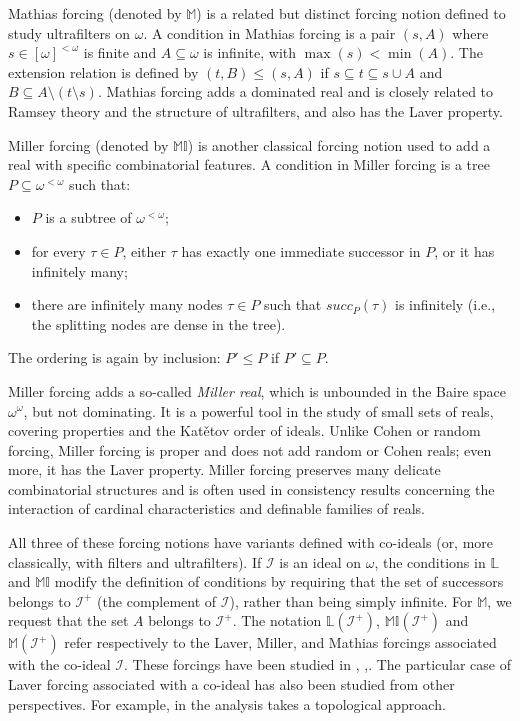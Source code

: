 \documentclass{amsart}
\theoremstyle{definition}
\theoremstyle{remark}
\numberwithin{equation}{section}
\newcommand{\li}{\mathbb{L}(\mathcal{I}^+)}
\newcommand{\lav}{\mathbb{L}}
\newcommand{\mil}{\mathbb{MI}}
\newcommand{\mat}{\mathbb{M}}
\newcommand{\id}{\mathcal{I}}
\begin{document}
Mathias forcing (denoted by $\mathbb{M}$) is a related but distinct forcing notion defined to study ultrafilters on $\omega$. A condition in Mathias forcing is a pair $(s,A)$ where $s \in [\omega]^{<\omega}$ is finite and $A \subseteq \omega$ is infinite, with $\max(s) < \min(A)$. The extension relation is defined by $(t,B) \leq (s,A)$ if $s \subseteq t \subseteq s \cup A$ and $B \subseteq A \setminus (t \setminus s)$. Mathias forcing adds a dominated real and is closely related to Ramsey theory and the structure of ultrafilters, and also has the Laver property.

Miller forcing (denoted by $\mathbb{MI}$) is another classical forcing notion used to add a real with specific combinatorial features. A condition in Miller forcing is a tree $P \subseteq \omega^{<\omega}$ such that:
\begin{itemize}
    \item $P$ is a subtree of $\omega^{<\omega}$;%
    \item for every $\tau \in P$, either $\tau$ has exactly one immediate successor in $P$, or it has infinitely many;
    \item there are infinitely many nodes $\tau \in P$ such that $succ_P(\tau)$ is infinitely (i.e., the splitting nodes are dense in the tree).
\end{itemize}
The ordering is again by inclusion: $P' \leq P$ if $P' \subseteq P$.

Miller forcing adds a so-called \emph{Miller real}, which is unbounded in the Baire space $\omega^\omega$, but not dominating. It is a powerful tool in the study of small sets of reals, covering properties and the Kat\v{e}tov order of ideals. Unlike Cohen or random forcing, Miller forcing is proper and does not add random or Cohen reals; even more, it has the Laver property. Miller forcing preserves many delicate combinatorial structures and is often used in consistency results concerning the interaction of cardinal characteristics and definable families of reals.

All three of these forcing notions have variants defined with co-ideals (or, more classically, with filters and ultrafilters). If $\mathcal{I}$ is an ideal on $\omega$, the conditions in $\lav$ and $\mil$ modify the definition of conditions by requiring that the set of successors belongs to $\id^+$ (the complement of $\id$), rather than being simply infinite. For $\mat$, we request that the set $A$ belongs to $\id^+$. The notation $\li$, $\mil(\id^+)$ and $\mat(\id^+)$ refer respectively to the Laver, Miller, and Mathias forcings associated with the co-ideal $\id$. These forcings have been studied in \cite{prikry}, \cite{4more},\cite{blaszczyk}. The particular case of Laver forcing associated with a co-ideal has also been studied from other perspectives. For example, in \cite{khomskii} the analysis takes a topological approach.
\end{document}
